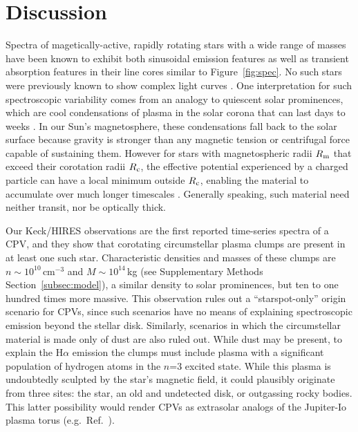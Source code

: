 \documentclass{nature3}
\begin{document}
\section{Discussion}

Spectra of magetically-active, rapidly rotating stars with a wide range
of masses have been known to exhibit both sinusoidal emission features
\cite{Donati2000,Townsend2005,Dunstone2006,Skelly2008} as well as
transient absorption features in their line cores
\cite{CollierCameron1989,CollierCameron1992,Cang2020} similar to
Figure~\ref{fig:spec}.  No such stars were previously known to show
complex light curves \cite{Bouma2024}.   One interpretation for
such spectroscopic variability comes from an analogy to quiescent solar
prominences, which are cool condensations of plasma in the solar corona
that can last days to weeks \cite{VialEngvold2015}.  In our Sun's
magnetosphere, these condensations fall back to the solar surface
because gravity is stronger than any magnetic tension or centrifugal force
capable of sustaining them.  However for stars with magnetospheric radii
$R_{\rm m}$ that exceed their corotation radii $R_{\rm c}$, the
effective potential experienced by a charged particle can have a local
minimum outside $R_{\rm c}$, enabling the material to accumulate over
much longer timescales \cite{Petit2013,Daley-Yates2024}.  Generally
speaking, such material need neither transit, nor be optically thick.

Our Keck/HIRES observations are the first reported time-series
spectra of a CPV, and they show that corotating circumstellar plasma clumps 
are present in at least one such star.
Characteristic densities and masses of these
clumps are $n \sim 10^{10}$\,cm$^{-3}$ and $M \sim 10^{14}$\,kg (see
Supplementary Methods Section~\ref{subsec:model}), a similar density to
solar prominences, but ten to one hundred times more massive.  This
observation rules out a ``starspot-only'' origin scenario for CPVs,
\cite{Koen2021} since such scenarios have no means of explaining
spectroscopic emission beyond the stellar disk.  Similarly, scenarios in
which the circumstellar material is made only of dust are also ruled
out.  While dust may be present, to explain the H$\alpha$ emission the
clumps must include plasma with a significant population of hydrogen
atoms in the $n$=3 excited state.  While this plasma is undoubtedly
sculpted by the star's magnetic field, it could plausibly originate from
three sites: the star, an old and undetected disk, or outgassing rocky
bodies.  This latter possibility would render CPVs as extrasolar analogs
of the Jupiter-Io plasma torus (e.g.~Ref.~\cite{Bagenal1981}).
\end{document}
